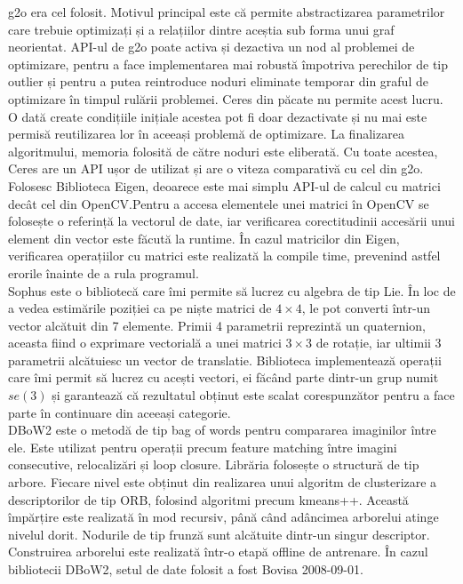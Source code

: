 \documentclass[12pt,a4paper]{report}
\begin{document}
g2o era cel folosit. Motivul principal este că permite abstractizarea parametrilor care 
trebuie optimizați și a relațiilor dintre aceștia sub forma unui graf neorientat. 
API-ul de g2o poate activa și dezactiva un nod al problemei de optimizare, pentru a face implementarea 
mai robustă împotriva perechilor de tip outlier și pentru a putea reintroduce noduri eliminate
temporar din graful de optimizare în timpul rulării problemei. Ceres din păcate nu permite acest lucru.
O dată create condițiile inițiale acestea pot fi doar dezactivate și nu mai este permisă reutilizarea lor în 
aceeași problemă de optimizare. La finalizarea algoritmului, memoria folosită de către noduri este eliberată.
Cu toate acestea, Ceres are un API ușor de utilizat și are o viteza comparativă cu cel din g2o.\\
Folosesc Biblioteca Eigen, deoarece este mai simplu API-ul de calcul cu matrici decât 
cel din OpenCV.\@ Pentru a accesa elementele unei matrici în OpenCV se folosește o referință la 
vectorul de date, iar verificarea corectitudinii accesării unui element din vector este făcută la runtime.
În cazul matricilor din Eigen, verificarea operațiilor cu matrici este realizată la compile time, prevenind
astfel erorile înainte de a rula programul. \\
Sophus este o bibliotecă care îmi permite să lucrez cu algebra de tip Lie. În loc de a vedea
estimările poziției ca pe niște matrici de $ 4 \times 4 $, le pot converti într-un vector alcătuit din 7 
elemente. Primii 4 parametrii reprezintă un quaternion, aceasta fiind o exprimare vectorială 
a unei matrici $ 3 \times 3 $ de rotație, iar ultimii 3 parametrii alcătuiesc un vector de translatie.
Biblioteca implementează operații care îmi permit să lucrez cu acești vectori, ei făcând parte 
dintr-un grup numit \(se(3)\) și garantează că rezultatul obținut este scalat corespunzător 
pentru a face parte în continuare din aceeași categorie. \\
DBoW2 este o metodă de tip bag of words pentru compararea imaginilor între ele. Este utilizat
pentru operații precum feature matching între imagini consecutive, relocalizări și loop closure.
Librăria folosește o structură de tip arbore. Fiecare nivel este obținut
din realizarea unui algoritm de clusterizare a descriptorilor de tip ORB, folosind algoritmi precum
kmeans++. Această împărțire este realizată în mod recursiv, până când adâncimea arborelui atinge nivelul dorit.
Nodurile de tip frunză sunt alcătuite dintr-un singur descriptor. Construirea arborelui este realizată într-o 
etapă offline de antrenare. În cazul bibliotecii DBoW2, setul de date folosit a fost Bovisa 2008{-}09{-}01. 
\end{document}
